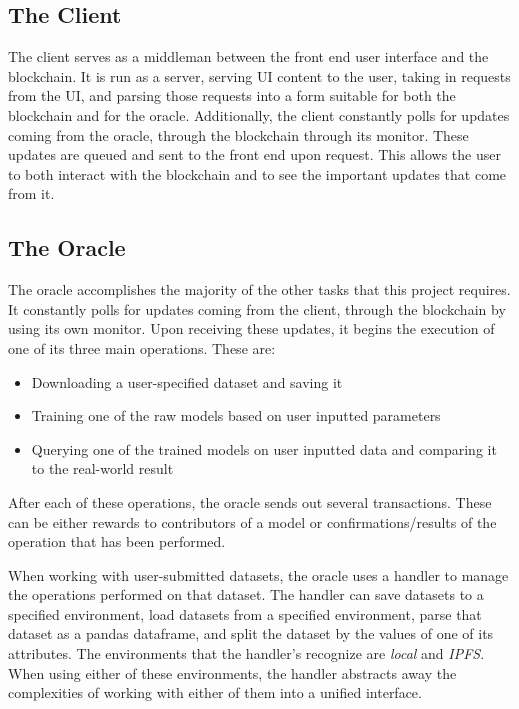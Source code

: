 \documentclass{article}
\begin{document}
    \subsection{The Client}

    The client serves as a middleman between the front end user interface and the blockchain.  It is run as a server,
    serving UI content to the user, taking in requests from the UI, and parsing those requests into a form suitable for
    both the blockchain and for the oracle.  Additionally, the client constantly polls for updates coming from the oracle,
    through the blockchain through its monitor.  These updates are queued and sent to the front end upon request. This
    allows the user to both interact with the blockchain and to see the important updates that come from it.

    \subsection{The Oracle}

    The oracle accomplishes the majority of the other tasks that this project requires.  It constantly polls for updates
    coming from the client, through the blockchain by using its own monitor.  Upon receiving these updates, it begins
    the execution of one of its three main operations.  These are:

    \begin{itemize}
        \item Downloading a user-specified dataset and saving it
        \item Training one of the raw models based on user inputted parameters
        \item Querying one of the trained models on user inputted data and comparing it to the real-world result
    \end{itemize}

    After each of these operations, the oracle sends out several transactions.  These can be either rewards to contributors
    of a model or confirmations/results of the operation that has been performed.

    When working with user-submitted datasets, the oracle uses a handler to manage the operations performed on that dataset.
    The handler can save datasets to a specified environment, load datasets from a specified environment, parse that dataset
    as a pandas dataframe, and split the dataset by the values of one of its attributes.  The environments that the handler's
    recognize are \textit{local} and \textit{IPFS}.  When using either of these environments, the handler abstracts away the
    complexities of working with either of them into a unified interface.
\end{document}
